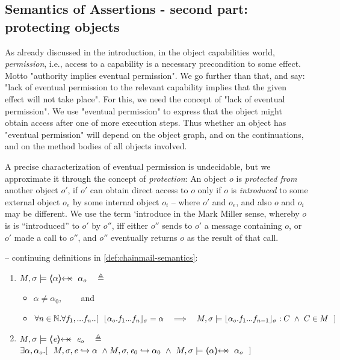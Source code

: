 \subsection{Semantics of Assertions - second part:
protecting objects}  

\label{sect:protect}
{
As  already discussed in the introduction, in the object capabilities world, \emph{permission}, i.e.,  access   to a capability is a necessary precondition to some effect. Motto "authority implies eventual permission".
We go further than that, and say: "lack of eventual permission to the relevant capability implies that the given effect will {not} take place".
For this, we need the concept of "lack of  eventual permission".  We use "eventual permission" to express that the object might obtain access after one of more execution steps. Thus whether an object has "eventual permission" will depend on the object graph, and on the continuations, and on the method bodies of all objects involved.  

A precise characterization of eventual permission is undecidable, but we approximate it through the concept of \emph{protection}:
{An object $o$ is \emph{protected  from} another object $o'$, if $o'$ can obtain direct access to   $o$ only if 
$o$ is \emph{introduced} to some external object $o_e$ by some internal object $o_i$ -- where $o'$ and $o_e$, and also $o$ and $o_i$ may be different.  
We  use the term `introduce in the Mark Miller sense, whereby $o$ is is ``introduced'' to $o'$ by $o''$, iff either $o''$ sends to $o'$ a message containing $o$, 
or $o'$ made a call to $o''$, and $o''$ eventually returns  $o$ as the result of that call.}
 


\begin{definition} 
\label{def:chainmail-protection-from}
\label{sect:semantics:assert:prtFrom}
-- continuing definitions in \ref{def:chainmail-semantics}:
\begin{enumerate}
\item
\label{cProtected}
 $\satisfiesA{M}{\sigma}{\protectedFrom{{\alpha}} {{\alpha_{o}}}}   \ \ \ \triangleq $ 
  \begin{itemize}
 \item
$\alpha\neq \alpha_0$,
 \ \ \ \  and%
 \item
$\forall n\in\mathbb{N}. \forall f_1,...f_n..
[\ \ \interpret{\sigma}{\alpha_{o}.f_1...f_n}=\alpha \ \ \  \Longrightarrow \ \ \  \satisfiesA{M}{\sigma}{ {\interpret{\sigma}{\alpha_{o}.f_1...f_{n-1}}}:C} \ \wedge \ C\in M\ \ ]$
\end{itemize}
\item
$\satisfiesA{M}{\sigma}{\protectedFrom{{\re}} {{\re_{o}}}} \ \ \ \triangleq $ \\
  $\exists \alpha, \alpha_{o}. [\  \ \eval{M}{\sigma}{{\re}}{\alpha}\ \wedge \eval{M}{\sigma}{{\re_0}}{\alpha_0} \  \wedge \ 
  \satisfiesA{M}{\sigma}{\protectedFrom{{\alpha}} {{\alpha_{o}}}}
 \ \  ]$
 \end{enumerate}
 \end{definition} 
 
}
